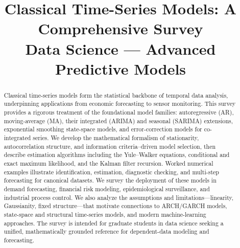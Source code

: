 \documentclass[conference]{IEEEtran}
\theoremstyle{definition}
\begin{document}
\title{Classical Time-Series Models: A Comprehensive Survey\\
{\large Data Science --- Advanced Predictive Models}}

\author{
\and
{}
}

\maketitle

\begin{abstract}
Classical time-series models form the statistical backbone of temporal data
analysis, underpinning applications from economic forecasting to sensor
monitoring. This survey provides a rigorous treatment of the foundational
model families: autoregressive (AR), moving-average (MA), their integrated
(ARIMA) and seasonal (SARIMA) extensions, exponential smoothing state-space
models, and error-correction models for co-integrated series. We develop the
mathematical formalism of stationarity, autocorrelation structure, and
information criteria–driven model selection, then describe estimation
algorithms including the Yule--Walker equations, conditional and exact maximum
likelihood, and the Kalman filter recursion. Worked numerical examples
illustrate identification, estimation, diagnostic checking, and multi-step
forecasting for canonical datasets. We survey the deployment of these models
in demand forecasting, financial risk modeling, epidemiological surveillance,
and industrial process control. We also analyze the assumptions and
limitations---linearity, Gaussianity, fixed structure---that motivate
connections to ARCH/GARCH models, state-space and structural time-series
models, and modern machine-learning approaches. The survey is intended for
graduate students in data science seeking a unified, mathematically grounded
reference for dependent-data modeling and forecasting.
\end{abstract}
\end{document}
